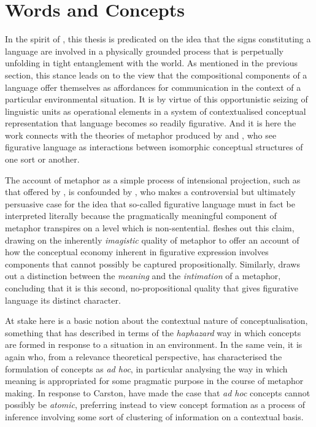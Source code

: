 \section{Words and Concepts}
In the spirit of \cite{Peirce}, this thesis is predicated on the idea that the signs constituting a language are involved in a physically grounded process that is perpetually unfolding in tight entanglement with the world.  As mentioned in the previous section, this stance leads on to the view that the compositional components of a language offer themselves as affordances for communication in the context of a particular environmental situation.  It is by virtue of this opportunistic seizing of linguistic units as operational elements in a system of contextualised conceptual representation that language becomes so readily figurative.  And it is here the work connects with the theories of metaphor produced by \cite{Black} and \cite{Lakoff}, who see figurative language as interactions between isomorphic conceptual structures of one sort or another.

The account of metaphor as a simple process of intensional projection, such as that offered by \cite{Searle}, is confounded by \cite{Davidson}, who makes a controversial but ultimately persuasive case for the idea that so-called figurative language must in fact be interpreted literally because the pragmatically meaningful component of metaphor transpires on a level which is non-sentential.  \cite{Carston} fleshes out this claim, drawing on the inherently \emph{imagistic} quality of metaphor to offer an account of how the conceptual economy inherent in figurative expression involves components that cannot possibly be captured propositionally.  Similarly, \cite{Reimer} draws out a distinction between the \emph{meaning} and the \emph{intimation} of a metaphor, concluding that it is this second, no-propositional quality that gives figurative language its distinct character.

At stake here is a basic notion about the contextual nature of conceptualisation, something that \cite{Barsalou} has described in terms of the \emph{haphazard} way in which concepts are formed in response to a situation in an environment.  In the same vein, it is again \cite{Carston} who, from a relevance theoretical perspective, has characterised the formulation of concepts as \emph{ad hoc}, in particular analysing the way in which meaning is appropriated for some pragmatic purpose in the course of metaphor making.  In response to Carston, \cite{Allott} have made the case that \emph{ad hoc} concepts cannot possibly be \emph{atomic}, preferring instead to view concept formation as a process of inference involving some sort of clustering of information on a contextual basis.

